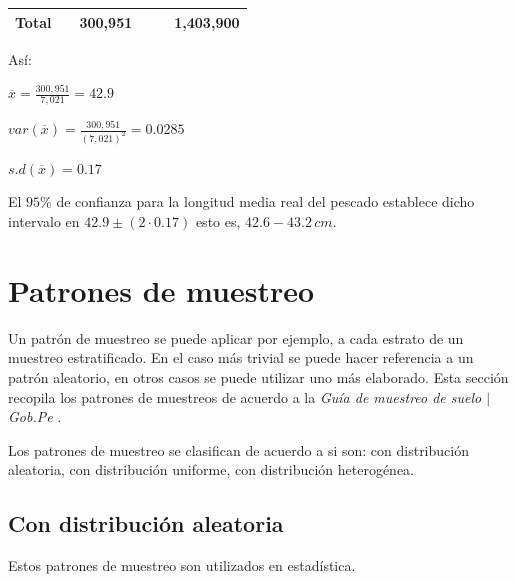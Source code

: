 \documentclass{report}
\begin{document}
\begin{table}[H]
\begin{tabular}{|l|l|l|l|l|l|}
\rowcolor[HTML]{FFCE93} 
Total                                                            &                                                             & 300,951                                                        &                                                                 &                                                                             & 1,403,900                         \\ \hline
\end{tabular}
\end{table}


Así:

\bigbreak

$\overline{x} = \frac{300,951}{7,021} = 42.9$

\bigbreak

$var(\overline{x}) = \frac{300,951}{(7,021)^2} = 0.0285$

\bigbreak

$s.d(\overline{x}) = 0.17$

\bigbreak

El $95\%$ de confianza para la longitud media real del pescado establece dicho intervalo en $42.9 \pm (2 \cdot 0.17)$ esto es, $42.6-43.2 \, cm$.

\section{Patrones de muestreo}

Un patrón de muestreo se puede aplicar por ejemplo, a cada estrato de un muestreo estratificado. En el caso más trivial se puede hacer referencia a un patrón aleatorio, en otros casos se puede utilizar uno más elaborado. Esta sección recopila los patrones de muestreos de acuerdo a la \textit{Guía de muestreo de suelo $\mid$ Gob.Pe} \cite{gobpe-ministerio-del-ambiente-2014}.

\bigbreak

Los patrones de muestreo se clasifican de acuerdo a si son:  con distribución aleatoria, con distribución uniforme, con distribución heterogénea.

\subsection{Con distribución aleatoria}

Estos patrones de muestreo son utilizados en estadística.

\bigbreak
\end{document}
